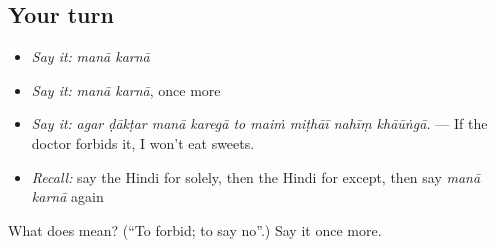\subsection*{Your turn}
\begin{itemize}
\raggedright
  \item \emph{Say it:} \emph{manā karnā}
  \item \emph{Say it:} \emph{manā karnā}, once more
  \item \emph{Say it:} \emph{agar ḍākṭar manā karegā to maiṁ miṭhāī nahīṃ khāūṅgā.} — If the doctor forbids it, I won't eat sweets.
  \item \emph{Recall:} say the Hindi for solely, then the Hindi for except, then say \emph{manā karnā} again
\end{itemize}

\begin{tcolorbox}[breakable,colback=teal!4,colframe=teal!35!black,title={Before you move on}]
What does   mean? (\textquotedblleft{}To forbid; to say no\textquotedblright{}.) Say it once more.
\end{tcolorbox}
